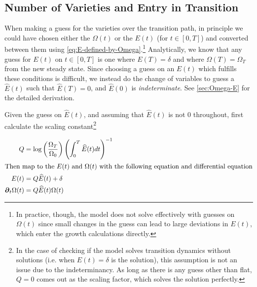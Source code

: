 \documentclass[11pt]{article}
\newcommand{\D}[1][]{\ensuremath{\boldsymbol{\partial}_{#1}}}
\begin{document}
\subsection{Number of Varieties and Entry in Transition}


When making a guess for the varieties over the transition path, in principle we could have chosen either the $\Omega(t)$ or the $E(t)$ (for $t \in [0,T]$) and converted between them using \cref{eq:E-defined-by-Omega}.\footnote{In practice, though, the model does not solve effectively with guesses on $\Omega(t)$ since small changes in the guess can lead to large deviations in $E(t)$, which enter the growth calculations directly.}  Analytically, we know that any guess for $E(t)$ on $t \in [0,T]$ is one where $E(T) = \delta$ and where $\Omega(T) = \Omega_T$ from the new steady state.  Since choosing a guess on an $E(t)$ which fulfills these conditions is difficult, we instead do the change of variables to guess a $\widehat{E}(t)$ such that $\widehat{E}(T) = 0$, and $\widehat{E}(0)$ is \textit{indeterminate}.  See \cref{sec:Omega-E} for the detailed derivation.

Given the guess on $\widehat{E}(t)$, and assuming that $\widehat{E}(t)$ is not $0$ throughout, first calculate the scaling constant\footnote{In the case of checking if the model solves transition dynamics without solutions (i.e. when $E(t) = \delta$ is the solution), this assumption is not an issue due to the indeterminancy.  As long as there is any guess other than flat, $Q = 0$ comes out as the scaling factor, which solves the solution perfectly.}

\begin{align}
	Q &= \log \left(\dfrac{\Omega_T}{\Omega_0}\right)\left(\int_0^T \widehat E(t) dt \right)^{-1}\\
	\intertext{Then map to the $E(t)$ and $\Omega(t)$ with the following equation and differential equation}
	E(t) &= Q \widehat{E}(t) + \delta\\
	\D[t] \Omega(t) &= Q \widehat{E}(t) \Omega(t)
\end{align}
\end{document}
